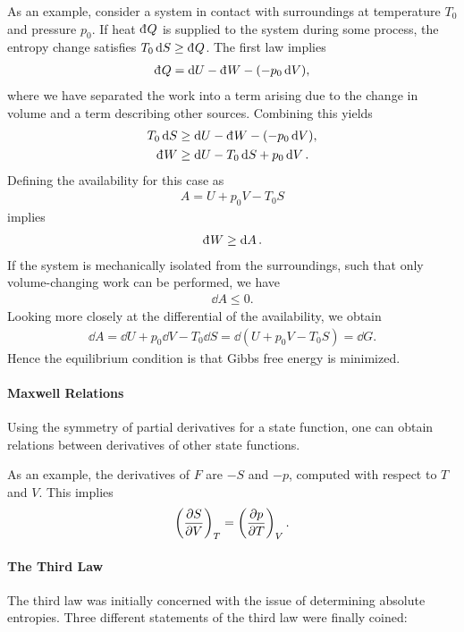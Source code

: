 As an example, consider a system in contact with surroundings at temperature $T_{0}$ and pressure $p_{0}$. If heat $\din{Q}$ is supplied to the system during some process, the entropy change satisfies $T_{0}\dd{S} \geq \din{Q}$. The first law implies
\begin{align*}
	\din{Q} = \dd{U} - \din{W} - (-p_{0}\dd{V}),
\end{align*}
where we have separated the work into a term arising due to the change in volume and a term describing other sources. Combining this yields
\begin{align*}
	T_{0}\dd{S} &\geq \dd{U} - \din{W} - (-p_{0}\dd{V}), \\
	\din{W}     &\geq \dd{U} - T_{0}\dd{S}  + p_{0}\dd{V}.
\end{align*}
Defining the availability for this case as
\begin{align*}
	A = U + p_{0}V - T_{0}S
\end{align*}
implies
\begin{align*}
	\din{W} \geq \dd{A}.
\end{align*}
If the system is mechanically isolated from the surroundings, such that only volume-changing work can be performed, we have
\begin{align*}
	\dd{A} \leq 0.
\end{align*}
Looking more closely at the differential of the availability, we obtain
\begin{align*}
	\dd{A} = \dd{U} + p_{0}\dd{V} - T_{0}\dd{S} = \dd(U + p_{0}V - T_{0}S) = \dd{G}.
\end{align*}
Hence the equilibrium condition is that Gibbs free energy is minimized.


\paragraph{Maxwell Relations}
Using the symmetry of partial derivatives for a state function, one can obtain relations between derivatives of other state functions.

As an example, the derivatives of $F$ are $-S$ and $-p$, computed with respect to $T$ and $V$. This implies
\begin{align*}
	\fix{\pdv{S}{V}}{T} = \fix{\pdv{p}{T}}{V}.
\end{align*}

\paragraph{The Third Law}
The third law was initially concerned with the issue of determining absolute entropies. Three different statements of the third law were finally coined:

